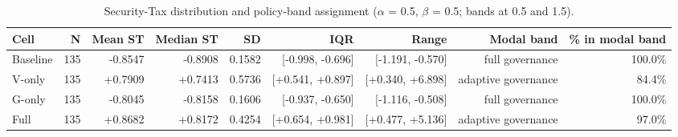 \begin{table}[htbp]
\centering
\small
\caption{Security-Tax distribution and policy-band assignment ($\alpha$ = 0.5, $\beta$ = 0.5; bands at 0.5 and 1.5).}
\label{tab:gmais-6}
\begin{tabular}{lrrrrrrrr}
\toprule
Cell & N & Mean ST & Median ST & SD & IQR & Range & Modal band & \% in modal band \\
\midrule
Baseline & 135 & -0.8547 & -0.8908 & 0.1582 & [-0.998, -0.696] & [-1.191, -0.570] & full governance & 100.0\% \\
V-only & 135 & +0.7909 & +0.7413 & 0.5736 & [+0.541, +0.897] & [+0.340, +6.898] & adaptive governance & 84.4\% \\
G-only & 135 & -0.8045 & -0.8158 & 0.1606 & [-0.937, -0.650] & [-1.116, -0.508] & full governance & 100.0\% \\
Full & 135 & +0.8682 & +0.8172 & 0.4254 & [+0.654, +0.981] & [+0.477, +5.136] & adaptive governance & 97.0\% \\
\bottomrule
\end{tabular}
\end{table}
